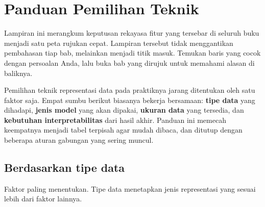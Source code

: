\chapter{Panduan Pemilihan Teknik}\label{panduan-pemilihan-teknik}

Lampiran ini merangkum keputusan rekayasa fitur yang tersebar di seluruh buku menjadi satu peta rujukan cepat. Lampiran tersebut tidak menggantikan pembahasan tiap bab, melainkan menjadi titik masuk. Temukan baris yang cocok dengan persoalan Anda, lalu buka bab yang dirujuk untuk memahami alasan di baliknya.

Pemilihan teknik representasi data pada praktiknya jarang ditentukan oleh satu faktor saja.
Empat sumbu berikut biasanya bekerja bersamaan: \textbf{tipe data} yang dihadapi,
\textbf{jenis model} yang akan dipakai, \textbf{ukuran data} yang tersedia, dan
\textbf{kebutuhan interpretabilitas} dari hasil akhir. Panduan ini memecah keempatnya
menjadi tabel terpisah agar mudah dibaca, dan ditutup dengan beberapa aturan
gabungan yang sering muncul.

\section{Berdasarkan tipe data}\label{berdasarkan-tipe-data}

Faktor paling menentukan. Tipe data menetapkan jenis representasi yang sesuai lebih dari faktor lainnya.

